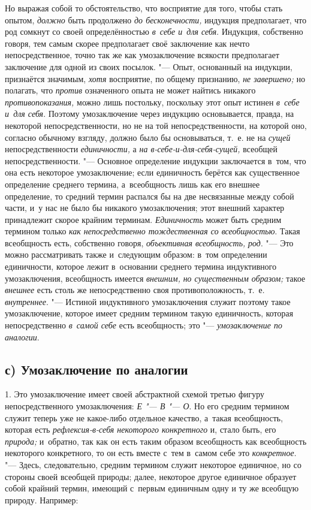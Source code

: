 Но выражая собой то обстоятельство, что восприятие для того,
чтобы стать опытом, {\em должно}
быть продолжено {\em до
бесконечности,} индукция предполагает, что род сомкнут со
своей определённостью {\em в~себе и~для
себя}. Индукция, собственно говоря, тем самым скорее
предполагает своё заключение как нечто непосредственное, точно так же как
умозаключение всякости предполагает заключение для одной из своих посылок.
"--- Опыт, основанный на индукции, признаётся значимым,
{\em хотя} восприятие, по
общему признанию, {\em не завершено;}
но полагать, что
{\em против} означенного
опыта не может найтись никакого
{\em противопоказания,}
можно лишь постольку, поскольку этот опыт истинен
{\em в~себе и~для себя}.
Поэтому умозаключение через индукцию основывается, правда, на
некоторой непосредственности, но не на той непосредственности, на которой
оно, согласно обычному взгляду, должно было бы основываться, т.~е. не на
{\em сущей}
непосредственности
{\em единичности,} а
{\em на в-себе-и-для-себя-сущей,}
всеобщей непосредственности. "--- Основное
определение индукции заключается в~том, что она есть некоторое
умозаключение; если единичность берётся как существенное определение
среднего термина, а~всеобщность лишь как его внешнее определение, то
средний термин распался бы на две несвязанные между собой части, и~у нас не
было бы никакого умозаключения; этот внешний характер принадлежит скорое
крайним терминам. {\em Единичность}
может быть средним термином только
{\em как непосредственно тождественная
со всеобщностью}. Такая всеобщность есть, собственно говоря,
{\em объективная всеобщность,}
{\em род}. "--- Это можно
рассматривать также и~следующим образом: в~том определении единичности,
которое лежит в~основании среднего термина индуктивного умозаключения,
всеобщность имеется {\em внешним,}
{\em но существенным образом;}
такое {\em внешнее}
есть столь же непосредственно своя противоположность, т.~е.
{\em внутреннее}. "---
Истиной индуктивного умозаключения служит поэтому
такое умозаключение, которое имеет средним термином такую
единичность, которая непосредственно
{\em в~самой себе} есть
всеобщность; это "--- {\em умозаключение по
аналогии}.

\subsection[с) Умозаключение по аналогии]{с) Умозаключение по аналогии}

1. Это умозаключение имеет своей абстрактной схемой третью
фигуру непосредственного умозаключения:
{\em Е "--- В
"--- О}. Но его средним термином служит теперь
уже не какое-либо отдельное качество, а~такая всеобщность, которая есть
{\em рефлексия-в-себя некоторого
конкретного} и, стало быть, его
{\em природа;} и~обратно,
так как он есть таким образом всеобщность как всеобщность некоторого
конкретного, то он есть вместе с~тем в~самом себе это
{\em конкретное}. "---
Здесь, следовательно, средним термином служит некоторое
единичное, но со стороны своей всеобщей природы; далее, некоторое другое
единичное образует собой крайний термин, имеющий с~первым единичным одну и
ту же всеобщую природу. Например:

